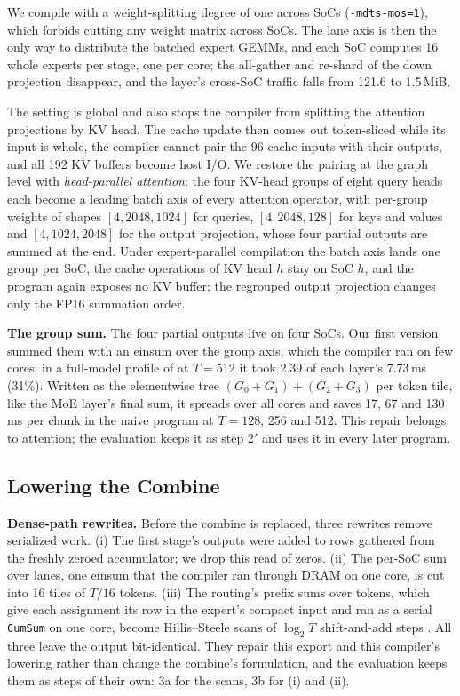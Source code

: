 We compile with a weight-splitting degree of one across SoCs (\texttt{-mdts-mos=1}), which forbids cutting any weight
matrix across SoCs. The lane axis is then the only way to distribute the batched expert GEMMs, and each SoC computes 16
whole experts per stage, one per core; the all-gather and re-shard of the down projection disappear, and the layer's
cross-SoC traffic falls from 121.6 to 1.5\,MiB.

The setting is global and also stops the compiler from splitting the attention projections by KV head. The cache update
then comes out token-sliced while its input is whole, the compiler cannot pair the 96 cache inputs with their outputs,
and all 192 KV buffers become host I/O. We restore the pairing at the graph level with \emph{head-parallel attention}:
the four KV-head groups of eight query heads each \citep{ainslie2023gqa} become a leading batch axis of every attention
operator, with per-group weights of shapes $[4,2048,1024]$ for queries, $[4,2048,128]$ for keys and values and
$[4,1024,2048]$ for the output projection, whose four partial outputs are summed at the end. Under expert-parallel
compilation the batch axis lands one group per SoC, the cache operations of KV head $h$ stay on SoC $h$, and the program
again exposes no KV buffer; the regrouped output projection changes only the FP16 summation order.

\textbf{The group sum.} The four partial outputs live on four SoCs. Our first version summed them with an einsum over the
group axis, which the compiler ran on few cores: in a full-model profile of \sys at $T=512$ it took 2.39 of each layer's
7.73\,ms (31\%). Written as the elementwise tree $(G_0+G_1)+(G_2+G_3)$ per token tile, like the MoE layer's final sum, it
spreads over all cores and saves 17, 67 and 130\,ms per chunk in the naive program at $T=128$, 256 and 512. This repair
belongs to attention; the evaluation keeps it as step 2$'$ and uses it in every later program.

\subsection{Lowering the Combine}
\label{sec:impl-comb}

\textbf{Dense-path rewrites.} Before the combine is replaced, three rewrites remove serialized work.
(i) The first stage's outputs were added to rows gathered from the freshly zeroed accumulator; we drop this read of
zeros. (ii) The per-SoC sum over lanes, one einsum that the compiler ran through DRAM on one core, is cut into 16 tiles of
$T/16$ tokens. (iii) The routing's prefix sums over tokens, which give each assignment its row in the expert's compact
input and ran as a serial \texttt{CumSum} on one core, become Hillis--Steele scans of $\log_2 T$ shift-and-add steps
\citep{hillis1986data}. All three leave the output bit-identical. They repair this export and this compiler's lowering
rather than change the combine's formulation, and the evaluation keeps them as steps of their own: 3a for the scans, 3b
for (i) and (ii).

